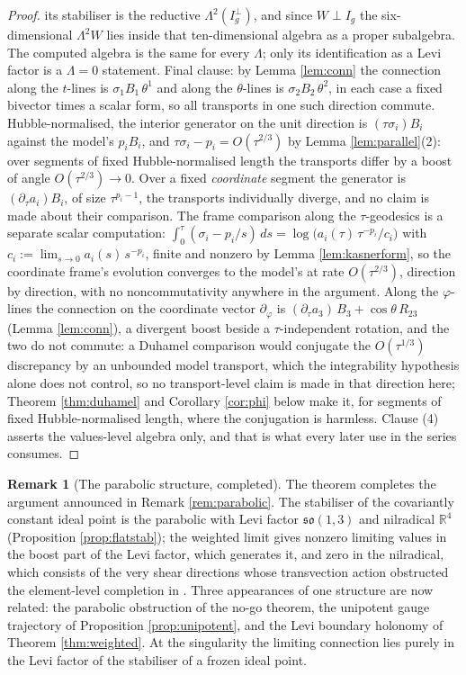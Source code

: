 \documentclass[11pt]{article}
\theoremstyle{definition}
\newtheorem{remark}[theorem]{Remark}
\newcommand{\R}{\mathbb{R}}
\begin{document}
\begin{proof}
its stabiliser is the reductive $\Lambda^2(I_g^\perp)$, and since $W \perp I_g$ the six-dimensional $\Lambda^2 W$ lies inside that ten-dimensional algebra as a proper subalgebra. The computed algebra is the same for every $\Lambda$; only its identification as a Levi factor is a $\Lambda = 0$ statement. Final clause: by Lemma \ref{lem:conn} the connection along the $t$-lines is $\sigma_1 B_1\,\theta^1$ and along the $\theta$-lines is $\sigma_2 B_2\,\theta^2$, in each case a fixed bivector times a scalar form, so all transports in one such direction commute. Hubble-normalised, the interior generator on the unit direction is $(\tau\sigma_i)B_i$ against the model's $p_iB_i$, and $\tau\sigma_i - p_i = O(\tau^{2/3})$ by Lemma \ref{lem:parallel}(2): over segments of fixed Hubble-normalised length the transports differ by a boost of angle $O(\tau^{2/3}) \to 0$. Over a fixed \emph{coordinate} segment the generator is $(\partial_\tau a_i)B_i$, of size $\tau^{p_i - 1}$, the transports individually diverge, and no claim is made about their comparison. The frame comparison along the $\tau$-geodesics is a separate scalar computation: $\int_0^\tau(\sigma_i - p_i/s)\,ds = \log\bigl(a_i(\tau)\,\tau^{-p_i}/c_i\bigr)$ with $c_i := \lim_{s \to 0} a_i(s)\,s^{-p_i}$, finite and nonzero by Lemma \ref{lem:kasnerform}, so the coordinate frame's evolution converges to the model's at rate $O(\tau^{2/3})$, direction by direction, with no noncommutativity anywhere in the argument. Along the $\varphi$-lines the connection on the coordinate vector $\partial_\varphi$ is $(\partial_\tau a_3)\,B_3 + \cos\theta\,R_{23}$ (Lemma \ref{lem:conn}), a divergent boost beside a $\tau$-independent rotation, and the two do not commute: a Duhamel comparison would conjugate the $O(\tau^{1/3})$ discrepancy by an unbounded model transport, which the integrability hypothesis alone does not control, so no transport-level claim is made in that direction here; Theorem \ref{thm:duhamel} and Corollary \ref{cor:phi} below make it, for segments of fixed Hubble-normalised length, where the conjugation is harmless. Clause (4) asserts the values-level algebra only, and that is what every later use in the series consumes.
\end{proof}

\begin{remark}[The parabolic structure, completed]\label{rem:consummation}
The theorem completes the argument announced in Remark \ref{rem:parabolic}. The stabiliser of the covariantly constant ideal point is the parabolic with Levi factor $\mathfrak{so}(1,3)$ and nilradical $\R^4$ (Proposition \ref{prop:flatstab}); the weighted limit gives nonzero limiting values in the boost part of the Levi factor, which generates it, and zero in the nilradical, which consists of the very shear directions whose transvection action obstructed the element-level completion in \cite[Thm.~4.2]{ButlerT1}. Three appearances of one structure are now related: the parabolic obstruction of the no-go theorem, the unipotent gauge trajectory of Proposition \ref{prop:unipotent}, and the Levi boundary holonomy of Theorem \ref{thm:weighted}. At the singularity the limiting connection lies purely in the Levi factor of the stabiliser of a frozen ideal point.
\end{remark}
\end{document}
